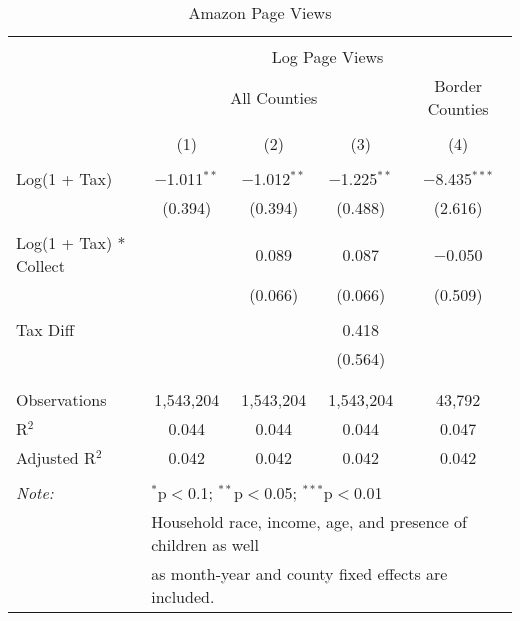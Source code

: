 
\begin{table}[!htbp] \centering 
  \caption{Amazon Page Views} 
  \label{} 
\begin{tabular}{@{\extracolsep{5pt}}lcccc} 
\\[-1.8ex]\hline 
\hline \\[-1.8ex] 
 & \multicolumn{4}{c}{Log Page Views} \\ 
\cline{2-5} 
 & \multicolumn{3}{c}{All Counties} & Border Counties \\ 
\\[-1.8ex] & (1) & (2) & (3) & (4)\\ 
\hline \\[-1.8ex] 
 Log(1 + Tax) & $-$1.011$^{**}$ & $-$1.012$^{**}$ & $-$1.225$^{**}$ & $-$8.435$^{***}$ \\ 
  & (0.394) & (0.394) & (0.488) & (2.616) \\ 
  & & & & \\ 
 Log(1 + Tax) * Collect &  & 0.089 & 0.087 & $-$0.050 \\ 
  &  & (0.066) & (0.066) & (0.509) \\ 
  & & & & \\ 
 Tax Diff &  &  & 0.418 &  \\ 
  &  &  & (0.564) &  \\ 
  & & & & \\ 
\hline \\[-1.8ex] 
Observations & 1,543,204 & 1,543,204 & 1,543,204 & 43,792 \\ 
R$^{2}$ & 0.044 & 0.044 & 0.044 & 0.047 \\ 
Adjusted R$^{2}$ & 0.042 & 0.042 & 0.042 & 0.042 \\ 
\hline 
\hline \\[-1.8ex] 
\textit{Note:}  & \multicolumn{4}{l}{$^{*}$p$<$0.1; $^{**}$p$<$0.05; $^{***}$p$<$0.01} \\ 
 & \multicolumn{4}{l}{Household race, income, age, and presence of children as well} \\ 
 & \multicolumn{4}{l}{as month-year and county fixed effects are included.} \\ 
\end{tabular} 
\end{table} 
